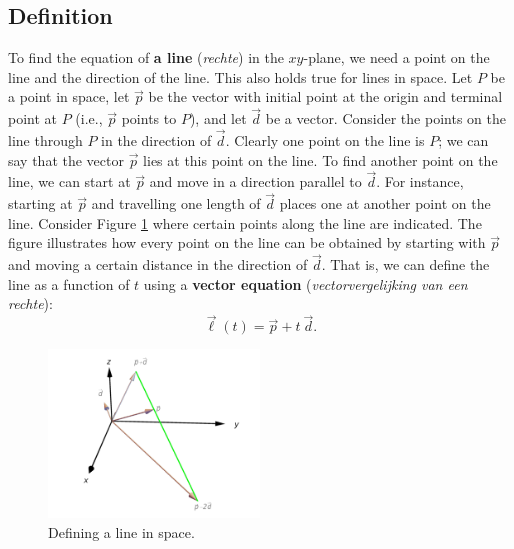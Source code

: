 \subsection{Definition}
\ifcourse
	\checkoddpage
{}
 \fi
To find the equation of \textbf{a line} (\textit{rechte}) in the $xy$-plane, we need a point on the line and the direction of the line. This also holds true for lines in space. Let $P$ be a point in space, let $\vec p$ be the vector with initial point at the origin and terminal point at $P$ (i.e., $\vec p$ points to $P$), and let $\vec d$ be a vector. Consider the points on the line through $P$ in the direction of $\vec d$. Clearly one point on the line is $P$; we can say that the vector $\vec p$ lies at this point on the line. To find another point on the line, we can start at $\vec p$ and move in a  direction parallel to $\vec d$. For instance, starting at $\vec p$ and travelling one length of $\vec d$ places one at another point on the line. Consider Figure \ref{fig_ana_geo_1} where certain points along the line are indicated. The figure illustrates how every point on the line can be obtained by starting with $\vec p$ and moving a certain distance in the direction of $\vec d$. That is, we can define the line as a function of $t$ using a \textbf{vector equation} (\textit{vectorvergelijking van een rechte}):
 
\begin{equation}\vec\ell(t) = \vec p + t\ \vec d.\label{eq:lines1}\end{equation}


\begin{figure}
	\begin{center}
			\includegraphics[width=0.5\textwidth]{fig_ana_geo_1}
	\caption{Defining a line in space.}
	\label{fig_ana_geo_1}
	\end{center}
\end{figure}

